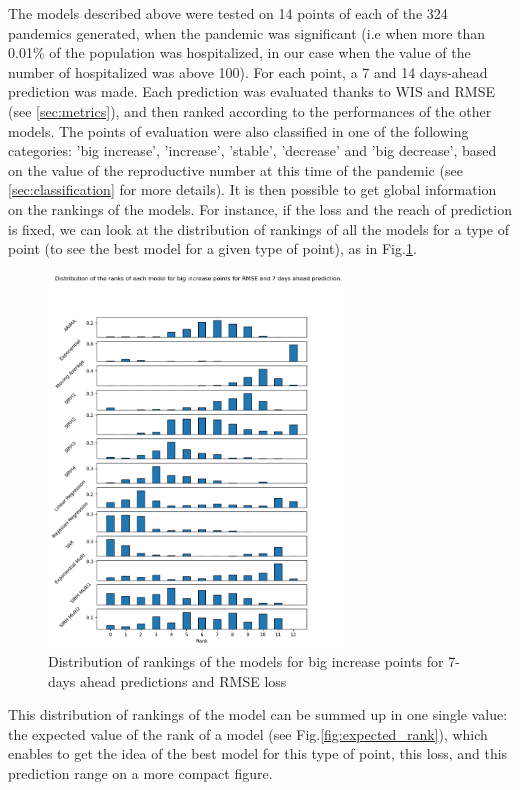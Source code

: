 The models described above were tested on 14 points of each of the 324 pandemics generated, when the pandemic was significant (i.e when more than 0.01\% of the population was hospitalized, in our case when the value of the number of hospitalized was above 100). 
For each point, a 7 and 14 days-ahead prediction was made. 
Each prediction was evaluated thanks to WIS and RMSE (see \ref{sec:metrics}), and then ranked according to the performances of the other models.
The points of evaluation were also classified in one of the following categories: 'big increase', 'increase', 'stable', 'decrease' and 'big decrease', based on the value of the reproductive number at this time of the pandemic (see \ref{sec:classification} for more details). 
It is then possible to get global information on the rankings of the models. 
For instance, if the loss and the reach of prediction is fixed, we can look at the distribution of rankings of all the models for a type of point (to see the best model for a given type of point), as in Fig.\ref{fig:rankings}.
\begin{figure}[h]
    \centering
    \includegraphics[width=0.7\textwidth]{figures/ranks_big_increase_RMSE_7.png}
    \caption{Distribution of rankings of the models for big increase points for 7-days ahead predictions and RMSE loss}
    \label{fig:rankings}
\end{figure}
This distribution of rankings of the model can be summed up in one single value: the expected value of the rank of a model (see Fig.\ref{fig:expected_rank}), which enables to get the idea of the best model for this type of point, this loss, and this prediction range on a more compact figure. 

